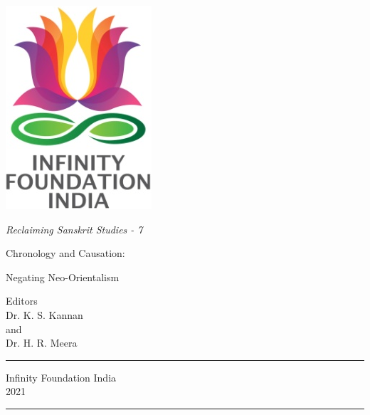 \thispagestyle{empty}
\begin{center}
\includegraphics[scale=0.3]{images/logo.png}
\bigskip

{\fontsize{10}{14}\selectfont\sl
Reclaiming Sanskrit Studies - 7
}

\bigskip
\end{center}
\medskip

\begin{center}
{{\fontsize{20}{24}\selectfont Chronology and Causation:}}

{{\fontsize{20}{24}\selectfont Negating Neo-Orientalism}}

\vfill


\bigskip
\bigskip

{\fontsize{14}{18}\selectfont 
Editors\\[3pt]
Dr. K. S. Kannan\\
and\\[3pt]
Dr. H. R. Meera}\par
\vfill

\rule{5cm}{1pt}

{\fontsize{12}{14}\selectfont
Infinity Foundation India\\[4pt]
2021}

\rule{5cm}{1pt}
\end{center}




